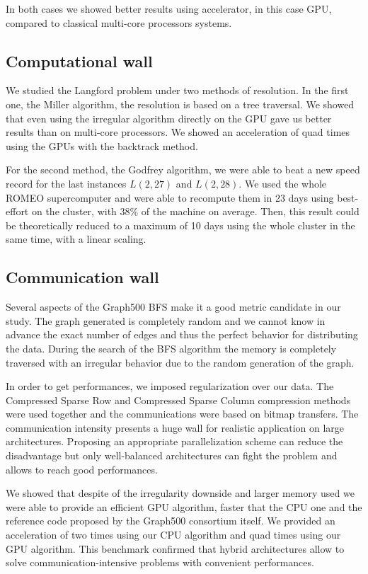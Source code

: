 In both cases we showed better results using accelerator, in this case GPU, compared to classical multi-core processors systems. 

\subsection{Computational wall}
We studied the Langford problem under two methods of resolution. 
In the first one, the Miller algorithm, the resolution is based on a tree traversal. 
We showed that even using the irregular algorithm directly on the GPU gave us better results than on multi-core processors. 
We showed an acceleration of quad times using the GPUs with the backtrack method.

For the second method, the Godfrey algorithm, we were able to beat a new speed record for the last instances $L(2,27)$ and $L(2,28)$.
We used the whole ROMEO supercomputer and were able to recompute them in 23 days using best-effort on the cluster, with 38\% of the machine on average.
Then, this result could be theoretically reduced to a maximum of 10 days using the whole cluster in the same time, with a linear scaling. 

\subsection{Communication wall}
Several aspects of the Graph500 BFS make it a good metric candidate in our study. 
The graph generated is completely random and we cannot know in advance the exact number of edges and thus the perfect behavior for distributing the data. 
During the search of the BFS algorithm the memory is completely traversed with an irregular behavior due to the random generation of the graph. 

In order to get performances, we imposed regularization over our data.
The Compressed Sparse Row and Compressed Sparse Column compression methods were used together and the communications were based on bitmap transfers. 
The communication intensity presents a huge wall for realistic application on large architectures. 
Proposing an appropriate parallelization scheme can reduce the disadvantage but only well-balanced architectures can fight the problem and allows to reach good performances. 

We showed that despite of the irregularity downside and larger memory used we were able to provide an efficient GPU algorithm, faster that the CPU one and the reference code proposed by the Graph500 consortium itself.
We provided an acceleration of two times using our CPU algorithm and quad times using our GPU algorithm.
This benchmark confirmed that hybrid architectures allow to solve communication-intensive problems with convenient performances.\\

